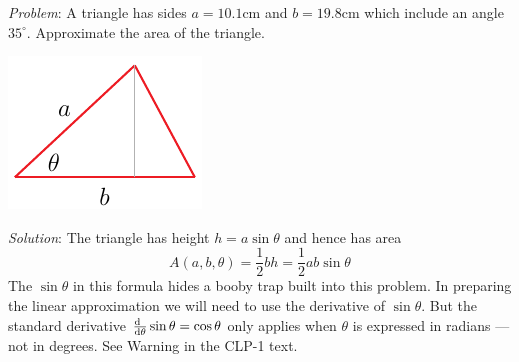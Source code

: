 \begin{eg}\label{eg error C}
\noindent\textit{Problem}:
A triangle has sides $a=10.1$cm and $b=19.8$cm which include an 
angle $35^\circ$. Approximate the area of the triangle.

\begin{efig}
\begin{center}
   \includegraphics{triangleError.pdf}
\end{center}
\end{efig}

\medskip
\noindent\textit{Solution}:
The triangle has height $h=a\sin\theta$ and hence has area
\begin{equation*}
A(a,b,\theta) = \frac{1}{2} bh =\frac{1}{2} ab\sin\theta
\end{equation*}
The $\sin\theta$ in this formula hides a booby trap built into this problem.
In preparing the linear approximation we will need to use the derivative
of $\sin\theta$. But the standard derivative $\diff{\hfill}{\theta}\sin\theta
=\cos\theta$ only applies when $\theta$ is expressed in radians --- not in
degrees. See Warning  in the CLP-1 text.


\end{eg}
